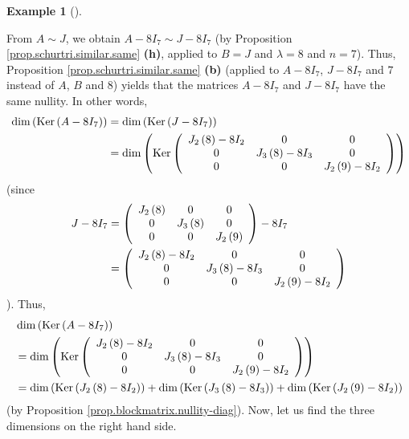 \documentclass[numbers=enddot,12pt,final,onecolumn,notitlepage]{scrartcl}%
\numberwithin{exer}{subsection}
\theoremstyle{definition}
\newtheorem{exam}[theo]{Example}
\newenvironment{example}[1][]
{\begin{exam}[#1]\begin{leftbar}}
{\end{leftbar}\end{exam}}
\begin{document}
\begin{example}
From $A\sim J$, we obtain $A-8I_{7}\sim J-8I_{7}$ (by Proposition
\ref{prop.schurtri.similar.same} \textbf{(h)}, applied to $B=J$ and
$\lambda=8$ and $n=7$). Thus, Proposition \ref{prop.schurtri.similar.same}
\textbf{(b)} (applied to $A-8I_{7}$, $J-8I_{7}$ and $7$ instead of $A$, $B$
and $8$) yields that the matrices $A-8I_{7}$ and $J-8I_{7}$ have the same
nullity. In other words,%
\begin{align*}
\dim\left(  \operatorname*{Ker}\left(  A-8I_{7}\right)  \right)   &
=\dim\left(  \operatorname*{Ker}\left(  J-8I_{7}\right)  \right) \\
&  =\dim\left(  \operatorname*{Ker}\left(
\begin{array}
[c]{ccc}%
J_{2}\left(  8\right)  -8I_{2} & 0 & 0\\
0 & J_{3}\left(  8\right)  -8I_{3} & 0\\
0 & 0 & J_{2}\left(  9\right)  -8I_{2}%
\end{array}
\right)  \right)
\end{align*}
(since%
\begin{align*}
J-8I_{7}  &  =\left(
\begin{array}
[c]{ccc}%
J_{2}\left(  8\right)  & 0 & 0\\
0 & J_{3}\left(  8\right)  & 0\\
0 & 0 & J_{2}\left(  9\right)
\end{array}
\right)  -8I_{7}\\
&  =\left(
\begin{array}
[c]{ccc}%
J_{2}\left(  8\right)  -8I_{2} & 0 & 0\\
0 & J_{3}\left(  8\right)  -8I_{3} & 0\\
0 & 0 & J_{2}\left(  9\right)  -8I_{2}%
\end{array}
\right)
\end{align*}
). Thus,%
\begin{align*}
&  \dim\left(  \operatorname*{Ker}\left(  A-8I_{7}\right)  \right) \\
&  =\dim\left(  \operatorname*{Ker}\left(
\begin{array}
[c]{ccc}%
J_{2}\left(  8\right)  -8I_{2} & 0 & 0\\
0 & J_{3}\left(  8\right)  -8I_{3} & 0\\
0 & 0 & J_{2}\left(  9\right)  -8I_{2}%
\end{array}
\right)  \right) \\
&  =\dim\left(  \operatorname*{Ker}\left(  J_{2}\left(  8\right)
-8I_{2}\right)  \right)  +\dim\left(  \operatorname*{Ker}\left(  J_{3}\left(
8\right)  -8I_{3}\right)  \right)  +\dim\left(  \operatorname*{Ker}\left(
J_{2}\left(  9\right)  -8I_{2}\right)  \right)
\end{align*}
(by Proposition \ref{prop.blockmatrix.nullity-diag}). Now, let us find the
three dimensions on the right hand side.


\end{example}
\end{document}
